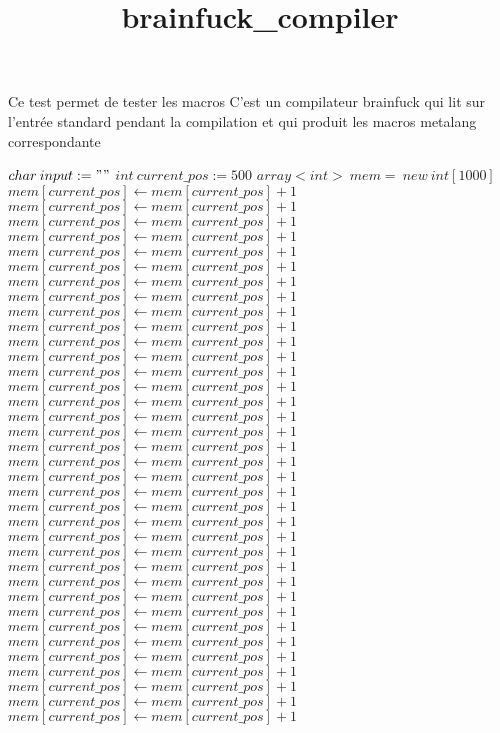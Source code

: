 \documentclass[8pt]{article}
\title{brainfuck\_compiler}
\begin{document}
\maketitle


Ce test permet de tester les macros
C'est un compilateur brainfuck qui lit sur l'entr\'ee standard pendant la compilation
et qui produit les macros metalang correspondante


\begin{algorithm}[H]
$char\:input := " "$\;
$int\:current\_pos := 500$\;
$array<int>\:mem=\:new\:int[1000]$\;
$mem[current\_pos] \leftarrow mem[current\_pos] + 1 $\;
$mem[current\_pos] \leftarrow mem[current\_pos] + 1 $\;
$mem[current\_pos] \leftarrow mem[current\_pos] + 1 $\;
$mem[current\_pos] \leftarrow mem[current\_pos] + 1 $\;
$mem[current\_pos] \leftarrow mem[current\_pos] + 1 $\;
$mem[current\_pos] \leftarrow mem[current\_pos] + 1 $\;
$mem[current\_pos] \leftarrow mem[current\_pos] + 1 $\;
$mem[current\_pos] \leftarrow mem[current\_pos] + 1 $\;
$mem[current\_pos] \leftarrow mem[current\_pos] + 1 $\;
$mem[current\_pos] \leftarrow mem[current\_pos] + 1 $\;
$mem[current\_pos] \leftarrow mem[current\_pos] + 1 $\;
$mem[current\_pos] \leftarrow mem[current\_pos] + 1 $\;
$mem[current\_pos] \leftarrow mem[current\_pos] + 1 $\;
$mem[current\_pos] \leftarrow mem[current\_pos] + 1 $\;
$mem[current\_pos] \leftarrow mem[current\_pos] + 1 $\;
$mem[current\_pos] \leftarrow mem[current\_pos] + 1 $\;
$mem[current\_pos] \leftarrow mem[current\_pos] + 1 $\;
$mem[current\_pos] \leftarrow mem[current\_pos] + 1 $\;
$mem[current\_pos] \leftarrow mem[current\_pos] + 1 $\;
$mem[current\_pos] \leftarrow mem[current\_pos] + 1 $\;
$mem[current\_pos] \leftarrow mem[current\_pos] + 1 $\;
$mem[current\_pos] \leftarrow mem[current\_pos] + 1 $\;
$mem[current\_pos] \leftarrow mem[current\_pos] + 1 $\;
$mem[current\_pos] \leftarrow mem[current\_pos] + 1 $\;
$mem[current\_pos] \leftarrow mem[current\_pos] + 1 $\;
$mem[current\_pos] \leftarrow mem[current\_pos] + 1 $\;
$mem[current\_pos] \leftarrow mem[current\_pos] + 1 $\;
$mem[current\_pos] \leftarrow mem[current\_pos] + 1 $\;
$mem[current\_pos] \leftarrow mem[current\_pos] + 1 $\;
$mem[current\_pos] \leftarrow mem[current\_pos] + 1 $\;
$mem[current\_pos] \leftarrow mem[current\_pos] + 1 $\;
$mem[current\_pos] \leftarrow mem[current\_pos] + 1 $\;
$mem[current\_pos] \leftarrow mem[current\_pos] + 1 $\;
$mem[current\_pos] \leftarrow mem[current\_pos] + 1 $\;
$mem[current\_pos] \leftarrow mem[current\_pos] + 1 $\;
$mem[current\_pos] \leftarrow mem[current\_pos] + 1 $\;

\end{algorithm}
\end{document}
